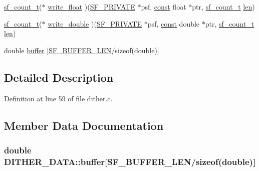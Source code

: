 \begin{DoxyCompactItemize}
\item 
\hyperlink{mac_2config_2i386_2lib-src_2libsndfile_2src_2sndfile_8h_a398121a5f562230ea7f772528fff5f84}{sf\+\_\+count\+\_\+t}($\ast$ \hyperlink{struct_d_i_t_h_e_r___d_a_t_a_adb6bf69a5a84eed2602efdc6bd8d5b16}{write\+\_\+float} )(\hyperlink{libsndfile_2src_2common_8h_ab5debd339ecaf40f50a223e218900c24}{S\+F\+\_\+\+P\+R\+I\+V\+A\+TE} $\ast$psf, \hyperlink{getopt1_8c_a2c212835823e3c54a8ab6d95c652660e}{const} float $\ast$ptr, \hyperlink{mac_2config_2i386_2lib-src_2libsndfile_2src_2sndfile_8h_a398121a5f562230ea7f772528fff5f84}{sf\+\_\+count\+\_\+t} \hyperlink{lib_2expat_8h_af86d325fecfc8f47b61fbf5a5146f582}{len})
\item 
\hyperlink{mac_2config_2i386_2lib-src_2libsndfile_2src_2sndfile_8h_a398121a5f562230ea7f772528fff5f84}{sf\+\_\+count\+\_\+t}($\ast$ \hyperlink{struct_d_i_t_h_e_r___d_a_t_a_a08f4563c3c7c6c0ec51c3de872e451f3}{write\+\_\+double} )(\hyperlink{libsndfile_2src_2common_8h_ab5debd339ecaf40f50a223e218900c24}{S\+F\+\_\+\+P\+R\+I\+V\+A\+TE} $\ast$psf, \hyperlink{getopt1_8c_a2c212835823e3c54a8ab6d95c652660e}{const} double $\ast$ptr, \hyperlink{mac_2config_2i386_2lib-src_2libsndfile_2src_2sndfile_8h_a398121a5f562230ea7f772528fff5f84}{sf\+\_\+count\+\_\+t} \hyperlink{lib_2expat_8h_af86d325fecfc8f47b61fbf5a5146f582}{len})
\item 
double \hyperlink{struct_d_i_t_h_e_r___d_a_t_a_ad538d6e1d6d42cef7520d5c265c48e00}{buffer} \mbox{[}\hyperlink{libsndfile_2src_2common_8h_a9ad225cf481d61f73f54fd0ca9b9af08}{S\+F\+\_\+\+B\+U\+F\+F\+E\+R\+\_\+\+L\+EN}/sizeof(double)\mbox{]}
\end{DoxyCompactItemize}


\subsection{Detailed Description}


Definition at line 59 of file dither.\+c.



\subsection{Member Data Documentation}
\subsubsection[{\texorpdfstring{buffer}{buffer}}]{\setlength{\rightskip}{0pt plus 5cm}double D\+I\+T\+H\+E\+R\+\_\+\+D\+A\+T\+A\+::buffer\mbox{[}{\bf S\+F\+\_\+\+B\+U\+F\+F\+E\+R\+\_\+\+L\+EN}/sizeof(double)\mbox{]}}\hypertarget{struct_d_i_t_h_e_r___d_a_t_a_ad538d6e1d6d42cef7520d5c265c48e00}{}\label{struct_d_i_t_h_e_r___d_a_t_a_ad538d6e1d6d42cef7520d5c265c48e00}


